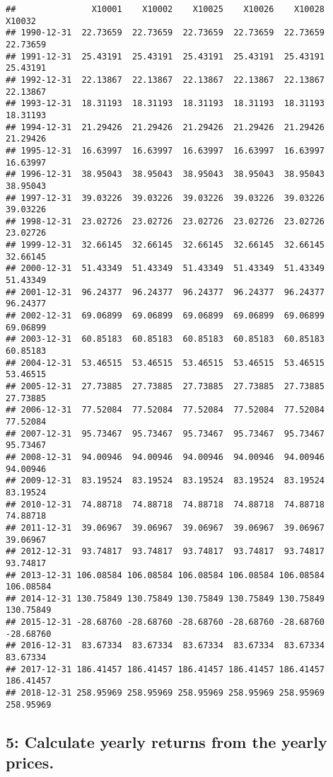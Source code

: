 \documentclass[
]{article}
\begin{document}
\begin{verbatim}
##               X10001    X10002    X10025    X10026    X10028    X10032
## 1990-12-31  22.73659  22.73659  22.73659  22.73659  22.73659  22.73659
## 1991-12-31  25.43191  25.43191  25.43191  25.43191  25.43191  25.43191
## 1992-12-31  22.13867  22.13867  22.13867  22.13867  22.13867  22.13867
## 1993-12-31  18.31193  18.31193  18.31193  18.31193  18.31193  18.31193
## 1994-12-31  21.29426  21.29426  21.29426  21.29426  21.29426  21.29426
## 1995-12-31  16.63997  16.63997  16.63997  16.63997  16.63997  16.63997
## 1996-12-31  38.95043  38.95043  38.95043  38.95043  38.95043  38.95043
## 1997-12-31  39.03226  39.03226  39.03226  39.03226  39.03226  39.03226
## 1998-12-31  23.02726  23.02726  23.02726  23.02726  23.02726  23.02726
## 1999-12-31  32.66145  32.66145  32.66145  32.66145  32.66145  32.66145
## 2000-12-31  51.43349  51.43349  51.43349  51.43349  51.43349  51.43349
## 2001-12-31  96.24377  96.24377  96.24377  96.24377  96.24377  96.24377
## 2002-12-31  69.06899  69.06899  69.06899  69.06899  69.06899  69.06899
## 2003-12-31  60.85183  60.85183  60.85183  60.85183  60.85183  60.85183
## 2004-12-31  53.46515  53.46515  53.46515  53.46515  53.46515  53.46515
## 2005-12-31  27.73885  27.73885  27.73885  27.73885  27.73885  27.73885
## 2006-12-31  77.52084  77.52084  77.52084  77.52084  77.52084  77.52084
## 2007-12-31  95.73467  95.73467  95.73467  95.73467  95.73467  95.73467
## 2008-12-31  94.00946  94.00946  94.00946  94.00946  94.00946  94.00946
## 2009-12-31  83.19524  83.19524  83.19524  83.19524  83.19524  83.19524
## 2010-12-31  74.88718  74.88718  74.88718  74.88718  74.88718  74.88718
## 2011-12-31  39.06967  39.06967  39.06967  39.06967  39.06967  39.06967
## 2012-12-31  93.74817  93.74817  93.74817  93.74817  93.74817  93.74817
## 2013-12-31 106.08584 106.08584 106.08584 106.08584 106.08584 106.08584
## 2014-12-31 130.75849 130.75849 130.75849 130.75849 130.75849 130.75849
## 2015-12-31 -28.68760 -28.68760 -28.68760 -28.68760 -28.68760 -28.68760
## 2016-12-31  83.67334  83.67334  83.67334  83.67334  83.67334  83.67334
## 2017-12-31 186.41457 186.41457 186.41457 186.41457 186.41457 186.41457
## 2018-12-31 258.95969 258.95969 258.95969 258.95969 258.95969 258.95969
\end{verbatim}

\subsection{5: Calculate yearly returns from the yearly
prices.}\label{calculate-yearly-returns-from-the-yearly-prices.}
\end{document}
